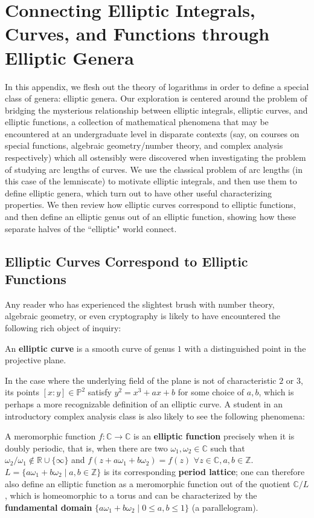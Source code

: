 
\section{Connecting Elliptic Integrals, Curves, and Functions through Elliptic Genera}

In this appendix, we flesh out the theory of logarithms in order to define a special class of genera: elliptic genera. Our exploration is centered around the problem of bridging the mysterious relationship between elliptic integrals, elliptic curves, and elliptic functions, a collection of mathematical phenomena that may be encountered at an undergraduate level in disparate contexts (say, on courses on special functions, algebraic geometry/number theory, and complex analysis respectively) which all ostensibly were discovered when investigating the problem of studying arc lengths of curves. We use the classical problem of arc lengths (in this case of the lemniscate) to motivate elliptic integrals, and then use them to define elliptic genera, which turn out to have other useful characterizing properties. We then review how elliptic curves correspond to elliptic functions, and then define an elliptic genus out of an elliptic function, showing how these separate halves of the ``elliptic" world connect.

\subsection{Elliptic Curves Correspond to Elliptic Functions}

Any reader who has experienced the slightest brush with number theory, algebraic geometry, or even cryptography is likely to have encountered the following rich object of inquiry:

\begin{definition}
    An \textbf{elliptic curve} is a smooth curve of genus $1$ with a distinguished point in the projective plane. 
\end{definition}
In the case where the underlying field of the plane is not of characteristic $2$ or $3$,  its points $[x: y] \in \mathbb{P}^2$ satisfy $y^2 = x^3 + ax +b$ for some choice of $a, b$, which is perhaps a more recognizable definition of an elliptic curve. A student in an introductory complex analysis class is also likely to see the following phenomena:

\begin{definition}
A meromorphic function  $f: \mathbb{C} \to \mathbb{C}$ is an \textbf{elliptic function} precisely when it is doubly periodic, that is, when there are two $\omega_1, \omega_2 \in \mathbb{C}$ such that $\omega_2/\omega_1 \notin \mathbb{R} \cup \{\infty \}$ and $f(z + a \omega_1 + b \omega_2) = f(z)$ $\forall z \in \mathbb{C}, a, b \in \mathbb{Z}$. $L = \{a \omega_1 + b \omega_2 \mid a, b \in \mathbb{Z} \}$ is its corresponding \textbf{period lattice}; one can therefore also define an elliptic function as a meromorphic function out of the quotient $\mathbb{C} / L$, which is homeomorphic to a torus and can be characterized by the \textbf{fundamental domain} $\{ a \omega_1 + b \omega_2 \mid 0 \leq a, b \leq 1\}$ (a parallelogram). 
\end{definition}

